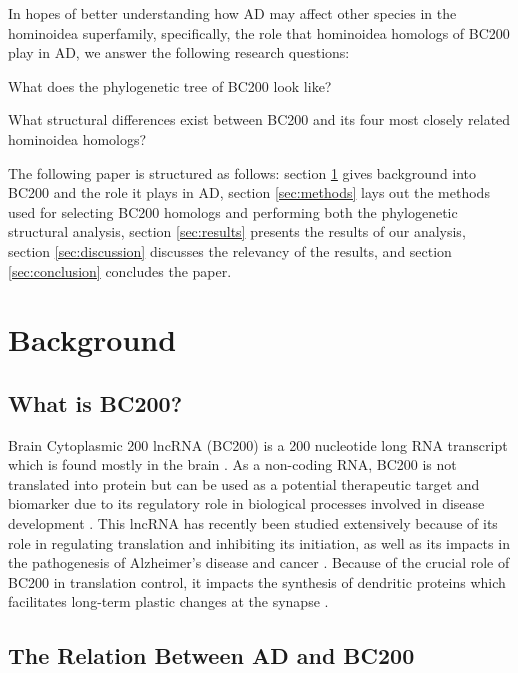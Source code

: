 \documentclass[conference, 11pt]{IEEEtran}
\begin{document}
In hopes of better understanding how AD may affect other species in the hominoidea superfamily, specifically, the role that hominoidea homologs of BC200 play in AD, we answer the following research questions:

\begin{questions}
  \item What does the phylogenetic tree of BC200 look like?
  \item What structural differences exist between BC200 and its four most closely related hominoidea homologs?
\end{questions}

The following paper is structured as follows: section \ref{sec:background} gives background into BC200 and the role it plays in AD, section \ref{sec:methods} lays out the methods used for selecting BC200 homologs and performing both the phylogenetic structural analysis, section \ref{sec:results} presents the results of our analysis, section \ref{sec:discussion} discusses the relevancy of the results, and section \ref{sec:conclusion} concludes the paper.

\section{Background}\label{sec:background}

\subsection{What is BC200?}

Brain Cytoplasmic 200 lncRNA (BC200) is a 200 nucleotide long RNA transcript which is found mostly in the brain \cite{tiedge1993primary}. 
As a non-coding RNA, BC200 is not translated into protein but can be used as a potential therapeutic target and biomarker due to its regulatory role in biological processes involved in disease development \cite{zhang2021role,mus2007dendritic}. 
This lncRNA has recently been studied extensively because of its role in regulating translation and inhibiting its initiation, as well as its impacts in the pathogenesis of Alzheimer's disease and cancer \cite{zhang2021role,tiedge1993primary}. 
Because of the crucial role of BC200 in translation control, it impacts the synthesis of dendritic proteins which facilitates long-term plastic changes at the synapse \cite{mus2007dendritic}.

\subsection{The Relation Between AD and BC200}
\end{document}
